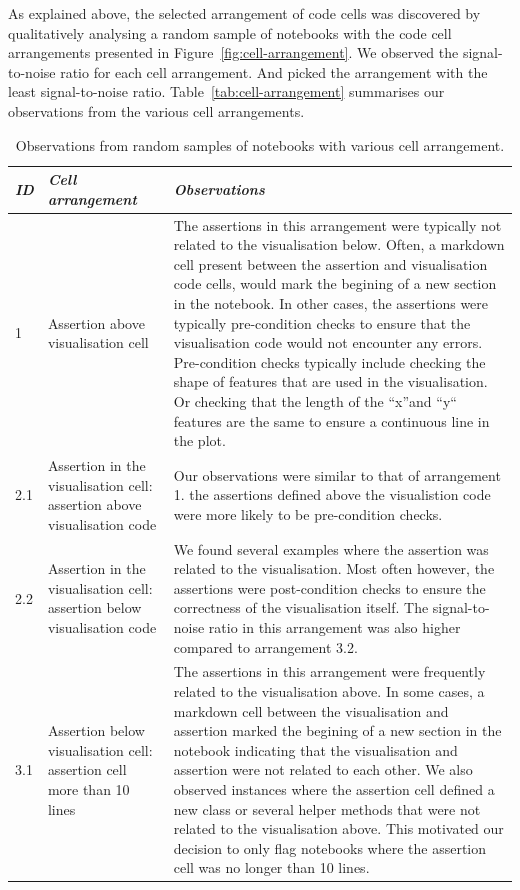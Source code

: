 \documentclass[acmsmall,screen,review,anonymous]{acmart}
\begin{document}
As explained above, the selected arrangement of code cells was discovered by qualitatively analysing a random sample of notebooks with the code cell arrangements presented in Figure~\ref{fig:cell-arrangement}. We observed the signal-to-noise ratio for each cell arrangement. And picked the arrangement with the least signal-to-noise ratio. Table~\ref{tab:cell-arrangement} summarises our observations from the various cell arrangements.

\begin{table}
  \centering
  \caption{Observations from random samples of notebooks with various
  cell arrangement.}
  \begin{tabular}{l p{} p{}}
    \toprule
    \emph{\textbf{ID}}&
    \emph{\textbf{Cell arrangement}} &
    \emph{\textbf{Observations}}\\
    \midrule
    1 &
    Assertion above visualisation cell &
    The assertions in this arrangement were typically not related to the visualisation below. Often, a markdown cell present between the assertion and visualisation code cells, would mark the begining of a new section in the notebook. In other cases, the assertions were typically pre-condition checks to ensure that the visualisation code would not encounter any errors. Pre-condition checks typically include checking the shape of features that are used in the visualisation. Or checking that the length of the ``x''and ``y`` features are the same to ensure a continuous line in the plot.\\
    2.1 &
    Assertion in the visualisation cell: assertion above visualisation code &
    Our observations were similar to that of arrangement 1. the assertions defined above the visualistion code were more likely to be pre-condition checks.\\
    2.2 &
    Assertion in the visualisation cell: assertion below visualisation code &
    We found several examples where the assertion was related to the visualisation. Most often however, the assertions were post-condition checks to ensure the correctness of the visualisation itself. The signal-to-noise ratio in this arrangement was also higher compared to arrangement 3.2.\\
    3.1 &
    Assertion below visualisation cell: assertion cell more than 10 lines &
    The assertions in this arrangement were frequently related to the visualisation above. In some cases, a markdown cell between the visualisation and assertion marked the begining of a new section in the notebook indicating that the visualisation and assertion were not related to each other. We also observed instances where the assertion cell defined a new class or several helper methods that were not related to the visualisation above. This motivated our decision to only flag notebooks where the assertion cell was no longer than 10 lines.\\

\end{tabular}
\end{table}
\end{document}
